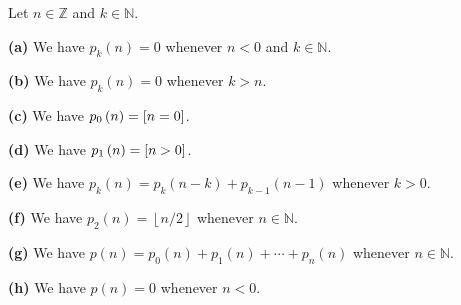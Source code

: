 \begin{proposition}
\label{prop.pars.basics}
\leantarget
\leanok
Let $n\in\mathbb{Z}$ and $k\in\mathbb{N}$. \medskip

\textbf{(a)} We have $p_{k}\left(  n\right)  =0$ whenever $n<0$ and
$k\in\mathbb{N}$. \medskip

\textbf{(b)} We have $p_{k}\left(  n\right)  =0$ whenever $k>n$. \medskip

\textbf{(c)} We have $p_{0}\left(  n\right)  =\left[ n=0 \right]$. \medskip

\textbf{(d)} We have $p_{1}\left(  n\right)  =\left[ n>0 \right]$. \medskip

\textbf{(e)} We have $p_{k}\left(  n\right)  =p_{k}\left(  n-k\right)
+p_{k-1}\left(  n-1\right)  $ whenever $k>0$. \medskip

\textbf{(f)} We have $p_{2}\left(  n\right)  =\left\lfloor n/2\right\rfloor $
whenever $n\in\mathbb{N}$. \medskip

\textbf{(g)} We have $p\left(  n\right)  =p_{0}\left(  n\right)  +p_{1}\left(
n\right)  +\cdots+p_{n}\left(  n\right)  $ whenever $n\in\mathbb{N}$. \medskip

\textbf{(h)} We have $p\left(  n\right)  =0$ whenever $n<0$.
\end{proposition}

